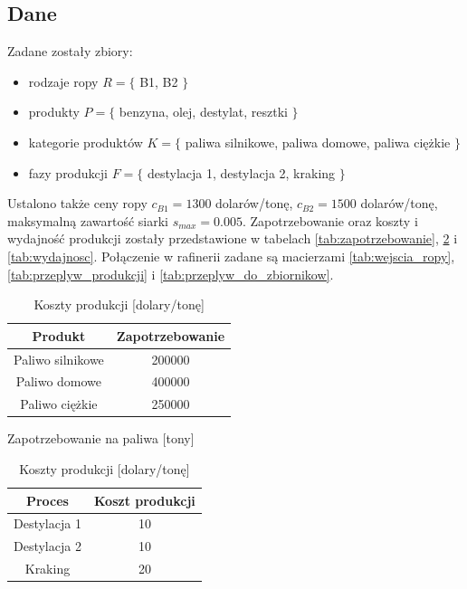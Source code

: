 \documentclass{article}
\begin{document}
\subsection{Dane}
Zadane zostały zbiory:
\begin{itemize}
    \item rodzaje ropy $R = \{$ B1, B2 $\}$
    \item produkty $P = \{$ benzyna, olej, destylat, resztki $\}$
    \item kategorie produktów $K = \{$ paliwa silnikowe, paliwa domowe, paliwa ciężkie $\}$
    \item fazy produkcji $F = \{$ destylacja 1, destylacja 2, kraking $\}$
\end{itemize}
Ustalono także ceny ropy $c_{B1} = 1300$ dolarów/tonę, $c_{B2} = 1500$ dolarów/tonę, maksymalną zawartość siarki $s_{max} = 0.005$. 
Zapotrzebowanie oraz koszty i wydajność produkcji zostały przedstawione w tabelach \ref{tab:zapotrzebowanie}, \ref{tab:koszty} i \ref{tab:wydajnosc}.
Połączenie w rafinerii zadane są macierzami \ref{tab:wejscia_ropy}, \ref{tab:przeplyw_produkcji} i \ref{tab:przeplyw_do_zbiornikow}.
\begin{table}[h]
    \centering
    \begin{minipage}{0.45\textwidth}
        \centering
        \begin{tabular}{c|c}
            Produkt & Zapotrzebowanie \\
            \hline
            Paliwo silnikowe & 200000 \\
            Paliwo domowe & 400000 \\
            Paliwo ciężkie & 250000 \\
        \end{tabular}
        \caption{Zapotrzebowanie na paliwa [tony]}
        \label{tab:zapotrzebowanie}
    \end{minipage}
    \hspace{1cm}
    \begin{minipage}{0.45\textwidth}
        \centering
        \begin{tabular}{c|c}
            Proces & Koszt produkcji \\
            \hline
            Destylacja 1 & 10 \\
            Destylacja 2 & 10 \\
            Kraking & 20 \\
        \end{tabular}
        \caption{Koszty produkcji [dolary/tonę]}
        \label{tab:koszty}
    \end{minipage}
\end{table}
\end{document}
